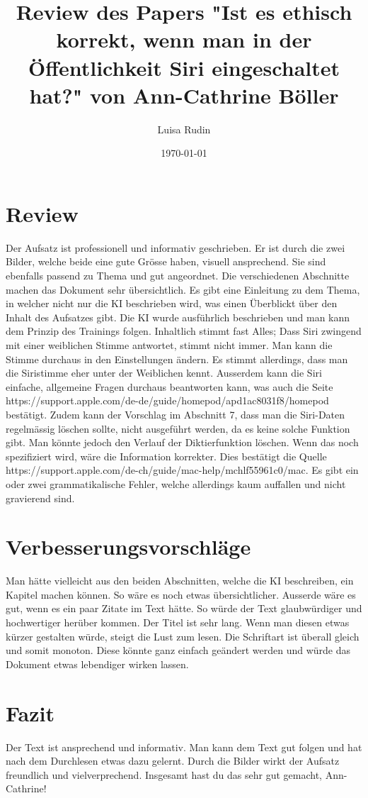 \documentclass{article}
\title{Review des Papers "Ist es ethisch korrekt, wenn man in der Öffentlichkeit Siri eingeschaltet hat?" von Ann-Cathrine Böller}
\author{Luisa Rudin}
\date{\today}
\begin{document}
\maketitle


\section{Review}
Der Aufsatz ist professionell und informativ geschrieben. Er ist durch die zwei Bilder, welche beide eine gute Grösse haben, visuell ansprechend. Sie sind ebenfalls passend zu Thema und gut angeordnet. Die verschiedenen Abschnitte machen das Dokument sehr übersichtlich. Es gibt eine Einleitung zu dem Thema, in welcher nicht nur die KI beschrieben wird, was einen Überblickt über den Inhalt des Aufsatzes gibt. Die KI wurde ausführlich beschrieben und man kann dem Prinzip des Trainings folgen. Inhaltlich stimmt fast Alles; Dass Siri zwingend mit einer weiblichen Stimme antwortet, stimmt nicht immer. Man kann die Stimme durchaus in den Einstellungen ändern. Es stimmt allerdings, dass man die Siristimme eher unter der Weiblichen kennt. Ausserdem kann die Siri einfache, allgemeine Fragen durchaus beantworten kann, was auch die Seite https://support.apple.com/de-de/guide/homepod/apd1ac8031f8/homepod bestätigt. Zudem kann der Vorschlag im Abschnitt 7, dass man die Siri-Daten regelmässig löschen sollte, nicht ausgeführt werden, da es keine solche Funktion gibt. Man könnte jedoch den Verlauf der Diktierfunktion löschen. Wenn das noch spezifiziert wird, wäre die Information korrekter. Dies bestätigt die Quelle https://support.apple.com/de-ch/guide/mac-help/mchlf55961c0/mac. Es gibt ein oder zwei grammatikalische Fehler, welche allerdings kaum auffallen und nicht gravierend sind. 

\section{Verbesserungsvorschläge}
Man hätte vielleicht aus den beiden Abschnitten, welche die KI beschreiben, ein Kapitel machen können. So wäre es noch etwas übersichtlicher. Ausserde wäre es gut, wenn es ein paar Zitate im Text hätte. So würde der Text glaubwürdiger und hochwertiger herüber kommen. Der Titel ist sehr lang. Wenn man diesen etwas kürzer gestalten würde, steigt die Lust zum lesen. Die Schriftart ist überall gleich und somit monoton. Diese könnte ganz einfach geändert werden und würde das Dokument etwas lebendiger wirken lassen. 

\section{Fazit}
Der Text ist ansprechend und informativ. Man kann dem Text gut folgen und hat nach dem Durchlesen etwas dazu gelernt. Durch die Bilder wirkt der Aufsatz freundlich und vielverprechend. Insgesamt hast du das sehr gut gemacht, Ann-Cathrine! 
\end{document}
